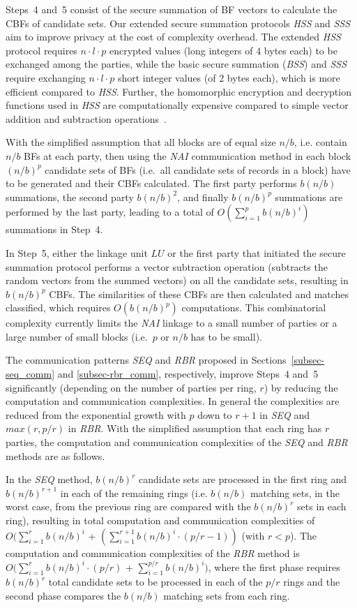 \documentclass{sig-alternate}
\begin{document}
Steps~4 and~5 consist of the secure summation of
BF vectors to calculate the 
CBFs of candidate sets. 
Our extended secure summation protocols \emph{HSS}
and \emph{SSS} aim to improve privacy at the cost of
complexity overhead. 
The extended \emph{HSS} protocol requires 
$n \cdot l \cdot p$ encrypted values (long integers of 4 bytes each) to be
exchanged among the parties, while the basic secure summation
(\emph{BSS}) and \emph{SSS} require exchanging
$n \cdot l \cdot p$
short integer values (of 2 bytes each), 
which is more efficient compared to \emph{HSS}.
Further, the 
homomorphic encryption and decryption functions used
in \emph{HSS} are computationally expensive compared
to
simple vector addition and subtraction operations~\cite{Lin09}.

With the simplified assumption that all blocks are of equal size
$n/b$, i.e. contain $n/b$ BFs at each party, 
then using the
\emph{NAI} communication method 
in each block $(n/b)^p$ candidate sets of BFs (i.e.\ all
candidate sets of records in a block) 
have to be generated and their
CBFs calculated. 
The first party performs $b(n/b)$ summations, the second party $b(n/b)^2$,
and finally $b(n/b)^p$ summations are performed by the
last party, leading to a total of $O(\sum_{i=1}^p b(n/b)^i)$
summations in Step~4. 

In Step~5, either the linkage unit $LU$ or 
the first party that initiated the secure summation protocol
performs a vector subtraction operation
(subtracts the random vectors from the summed vectors) on all the
candidate sets, resulting in $b(n/b)^p$ CBFs.
The similarities of these CBFs are then calculated
and matches classified, which requires $O(b(n/b)^p)$ computations.
This combinatorial complexity currently limits the
\emph{NAI} linkage
to a small number of parties or a large number of small
blocks (i.e.\ $p$ or $n/b$ has to be small). 

The communication patterns \emph{SEQ} and \emph{RBR} proposed in 
Sections~\ref{subsec-seq_comm} and \ref{subsec-rbr_comm}, respectively, 
improve Steps~4 and~5 significantly (depending on the 
number of parties per ring, $r$) by reducing the computation 
and communication complexities.
In general the complexities are reduced from the
exponential growth with $p$ down to $r+1$ in \emph{SEQ} and $max(r,p/r)$ in \emph{RBR}.
With the simplified
assumption that each ring has $r$ parties, the computation and
communication complexities of the \emph{SEQ} and \emph{RBR} methods are
as follows.

In the \emph{SEQ} method, $b(n/b)^r$ candidate sets are processed in
the first ring and $b(n/b)^{r+1}$ in each of the remaining rings
(i.e. $b(n/b)$ matching
sets, in the worst case, from the previous ring are compared with
the $b(n/b)^r$ sets in each ring),
resulting in total computation and communication complexities of 
$O(\sum_{i=1}^r b(n/b)^{i}$ + $(\sum_{i=1}^{r+1} b(n/b)^{i} \cdot (p/r-1))$ (with $r < p$).
The
computation and communication complexities of the \emph{RBR} method is 
$O(\sum_{i=1}^r b(n/b)^{i} \cdot (p/r)$ + $\sum_{i=1}^{p/r} b(n/b)^{i})$, where the first phase requires
$b(n/b)^r$ total candidate sets to be processed
in each of the $p/r$ rings and the second phase compares
the $b(n/b)$ matching sets from each ring.
\end{document}
